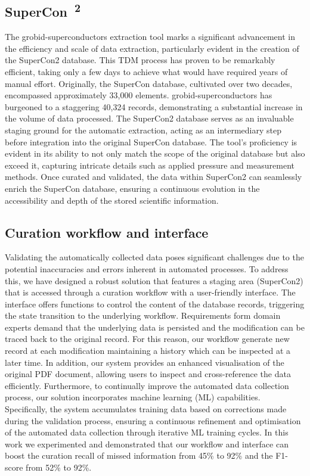 \subsection{SuperCon~\textsuperscript{2}}

The grobid-superconductors extraction tool marks a significant advancement in the efficiency and scale of data extraction, particularly evident in the creation of the SuperCon2 database. 
This TDM process has proven to be remarkably efficient, taking only a few days to achieve what would have required years of manual effort. 
Originally, the SuperCon database, cultivated over two decades, encompassed approximately 33,000 elements. grobid-superconductors has burgeoned to a staggering 40,324 records, demonstrating a substantial increase in the volume of data processed. 
The SuperCon2 database serves as an invaluable staging ground for the automatic extraction, acting as an intermediary step before integration into the original SuperCon database. 
The tool's proficiency is evident in its ability to not only match the scope of the original database but also exceed it, capturing intricate details such as applied pressure and measurement methods. 
Once curated and validated, the data within SuperCon2 can seamlessly enrich the SuperCon database, ensuring a continuous evolution in the accessibility and depth of the stored scientific information.

\subsection{Curation workflow and interface}

Validating the automatically collected data poses significant challenges due to the potential inaccuracies and errors inherent in automated processes. 
To address this, we have designed a robust solution that features a staging area (SuperCon2) that is accessed through a curation workflow with a user-friendly interface. 
The interface offers functions to control the content of the database records, triggering the state transition to the underlying workflow. 
Requirements form domain experts demand that the underlying data is persisted and the modification can be traced back to the original record. For this reason, our workflow generate new record at each modification maintaining a history which can be inspected at a later time. 
In addition, our system provides an enhanced visualisation of the original PDF document, allowing users to inspect and cross-reference the data efficiently. 
Furthermore, to continually improve the automated data collection process, our solution incorporates machine learning (ML) capabilities. 
Specifically, the system accumulates training data based on corrections made during the validation process, ensuring a continuous refinement and optimisation of the automated data collection through iterative ML training cycles.
In this work we experimented and demonstrated that our workflow and interface can boost the curation recall of missed information from 45\% to 92\% and the F1-score from 52\% to 92\%. 